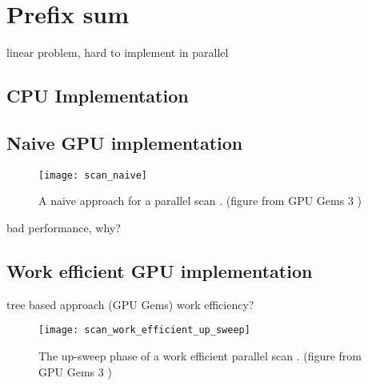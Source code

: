 \section{Prefix sum}
\label{sec:prefix_sum}

linear problem, hard to implement in parallel

\subsection{CPU Implementation}




\subsection{Naive GPU implementation}

\begin{figure}
\centering
\texttt{[image: scan\_naive]}
\caption{A naive approach for a parallel scan \cite{scan_naive}. (figure from GPU Gems 3 \cite{gpu_gems_3_chapter_39})}
\label{fig:scan_naive}
\end{figure}





bad performance, why?

\subsection{Work efficient GPU implementation}

tree based approach (GPU Gems) work efficiency?

\begin{figure}
\centering
\texttt{[image: scan\_work\_efficient\_up\_sweep]}
\caption{The up-sweep phase of a work efficient parallel scan \cite{scan_blelloch}.  (figure from GPU Gems 3 \cite{gpu_gems_3_chapter_39})}
\label{fig:scan_work_efficient_up_sweep}
\end{figure}

